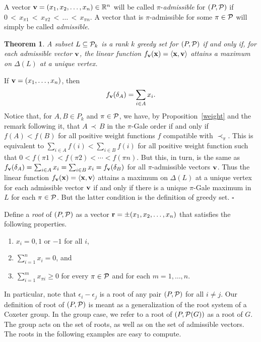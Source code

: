 \documentclass[12pt]{article}
\newcommand{\R}{{\mathbb R}}
\renewcommand{\P}{{\cal P}}
\newcommand{\proof}{\noindent{\em Proof: }}
\newcommand{\B}{\bigskip}
\newcommand{\qed}{\hspace{\fill}$\square$}
\newtheorem{theorem}[equation]{Theorem}
\begin{document}
A vector ${\bf v} = (x_1,x_2, \dots, x_n) \in \R^n$ will be called
$\pi$-{\it admissible} for $(P,\P)$ if $0 \, < \, x_{\pi 1} \, < \,
x_{\pi 2} \, < \, \dots \, < \, x_{\pi n}$.  A vector that is
$\pi$-admissible for some $\pi \in \P$ will simply be called {\it
admissible}.

\begin{theorem} \label{adm} A subset $L \subseteq \P_k$ is a rank $k$
greedy set for $(P,\P)$ if and only if, for each admissible vector
${\bf v}$, the linear function $f_{\bf v}({\bf x}) = \langle {\bf x},
{\bf v} \rangle$ attains a maximum on $\Delta(L)$ at a unique vertex.
\end{theorem}

\proof If ${\bf v} = (x_1, \dots , x_n)$, then
$$f_{{\bf v}}(\delta_A) = \sum_{i \in A} x_i.$$
Notice that, for $A,B \in P_k$ and $\pi \in \P$, we have, by
Proposition~\ref{weight} and the remark following it, that $A \, \prec
\, B$ in the $\pi$-Gale order if and only if $f(A) < f(B)$ for all
positive weight functions $f$ compatible with $\prec_{\pi}$.  This
is equivalent to $\sum_{i\in A} f(i) < \sum_{i\in B} f(i)$ for all
positive weight function such that $0 < f(\pi 1) < f(\pi 2) < \cdots
< f(\pi n)$.  But this, in turn, is the same as
$f_{{\bf v}}(\delta_A) = \sum_{i \in A} x_i = \sum_{i \in B} x_i =
f_{{\bf v}}(\delta_B)$ for all $\pi$-admissible vectors ${\bf v}$.
Thus the linear function $f_{\bf v}({\bf x}) = \langle {\bf
x}, {\bf v} \rangle$ attains a maximum on $\Delta(L)$ at a unique
vertex for each admissible vector ${\bf v}$ if and only if there is a
unique $\pi$-Gale maximum in $L$ for each $\pi \in \P$.  But the
latter condition is the definition of greedy set. \qed \B

Define a {\it root} of $(P, \P)$ as a vector ${\bf r} = \pm (x_1,x_2,\dots
,x_n)$ that satisfies the following properties.
\begin{enumerate}
\item $x_i = 0, 1$ or $-1$ for all $i$,
\item $\sum_{i=1}^n x_i = 0$, and
\item $\sum_{i=1}^m x_{\pi i} \geq 0$ for every $\pi \in \P$ and for
each $m = 1, \dots, n$.
\end{enumerate}

In particular, note that $\epsilon_i-\epsilon_j$ is a root of any pair
$(P, \P)$ for all $i\neq  j$.  Our definition  of root of $(P, \P)$ is
meant as a  generalization of the root system  of a Coxeter group.  In
the group case, we refer  to a root of $(P,  \P(G))$ as a root of $G$.
The group acts on the  set of roots, as well as  on the set of
admissible  vectors.  The roots in the  following examples are easy to
compute.  \B
\end{document}
